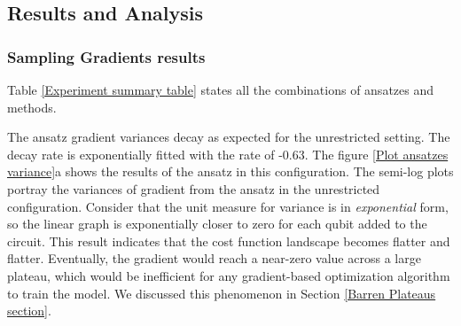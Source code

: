 \subsection{Results and Analysis} \label{Result section}
\subsubsection{Sampling Gradients results}
Table \ref{Experiment summary table} states all the combinations of ansatzes and methods.

The ansatz gradient variances decay as expected for the unrestricted setting.
The decay rate is exponentially fitted with the rate of -0.63.
The figure \ref{Plot ansatzes variance}a shows the results of the ansatz in this configuration.
The semi-log plots portray the variances of gradient from the ansatz in the unrestricted configuration.
Consider that the unit measure for variance is in \emph{exponential} form, so the linear graph is exponentially closer to zero for each qubit added to the circuit.
This result indicates that the cost function landscape becomes flatter and flatter.
Eventually, the gradient would reach a near-zero value across a large plateau, which would be inefficient for any gradient-based optimization algorithm to train the model.
We discussed this phenomenon in Section \ref{Barren Plateaus section}.


